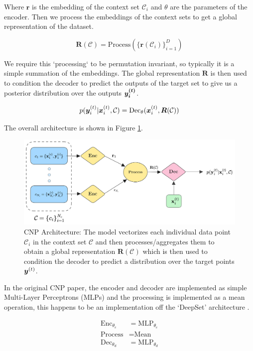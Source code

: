 \documentclass[../../main.tex]{subfiles}
\begin{document}
Where $\bm{r}$ is the embedding of the context set $\mathcal{C}_i$ and $\theta$ are the parameters of the encoder. Then we process the embeddings of the context sets to get a global representation of the dataset. 

\begin{equation}
    \bm{R}(\mathcal{C}) = \text{Process}(\{ \bm{r}(\mathcal{C}_i) \}_{i=1}^D)
\end{equation}

We require this `processing` to be permutation invariant, so typically it is a simple summation of the embeddings. The global representation $\bm{R}$ is then used to condition the decoder to predict the outputs of the target set to give us a posterior distribution over the outputs $\bm{y_i^{(t)}}$.

\begin{equation}
    p(\bm{y}_i^{(t)} | \bm{x}_i^{(t)}, \mathcal{C}) = \text{Dec}_\theta(\bm{x}_i^{(t)}, \bm{R}(\mathcal{C}))
\end{equation}

The overall architecture is shown in Figure \ref{fig:cnp-architecture}.

\begin{figure}[H]
	\centering
	\includegraphics[height=0.3\textwidth]{./cnp.png}
	\caption{CNP Architecture: The model vectorizes each individual data point $\mathcal{C}_i$ in the context set $\mathcal{C}$ and then processes/aggregates them to obtain a global representation $\bm{R}(\mathcal{C})$ which is then used to condition the decoder to predict a distribution over the target points $\bm{y}^{(t)}$.}
    \label{fig:cnp-architecture}
\end{figure}


In the original CNP paper, the encoder and decoder are implemented as simple Multi-Layer Perceptrons (MLPs) and the processing is implemented as a mean operation, this happens to be an implementation off the `DeepSet' architecture \cite{zaheer2018deep}.

\begin{align*}
    \text{Enc}_{\theta_e} &= \text{MLP}_{\theta_e} \\
    \text{Process} &= \text{Mean} \\
    \text{Dec}_{\theta_d}  &= \text{MLP}_{\theta_d} 
\end{align*}
\end{document}
